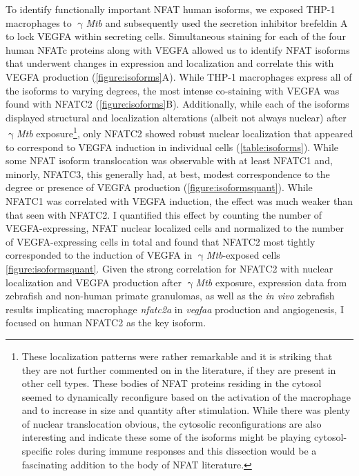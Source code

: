 To identify functionally important NFAT human isoforms, we exposed THP\hyp{}1 macrophages to $\upgamma$\textit{Mtb} and subsequently used the secretion inhibitor brefeldin A to lock VEGFA within secreting cells. Simultaneous staining for each of the four human NFATc proteins along with VEGFA allowed us to identify NFAT isoforms that underwent changes in expression and localization and correlate this with VEGFA production (\autoref{figure:isoforms}A). While THP\hyp{}1 macrophages express all of the isoforms to varying degrees, the most intense co\hyp{}staining with VEGFA was found with NFATC2 (\autoref{figure:isoforms}B). Additionally, while each of the isoforms displayed structural and localization alterations (albeit not always nuclear) after $\upgamma$\textit{Mtb} exposure\footnote{These localization patterns were rather remarkable and it is striking that they are not further commented on in the literature, if they are present in other cell types. These bodies of NFAT proteins residing in the cytosol seemed to dynamically reconfigure based on the activation of the macrophage and to increase in size and quantity after stimulation. While there was plenty of nuclear translocation obvious, the cytosolic reconfigurations are also interesting and indicate these some of the isoforms might be playing cytosol-specific roles during immune responses and this dissection would be a fascinating addition to the body of NFAT literature.}, only NFATC2 showed robust nuclear localization that appeared to correspond to VEGFA induction in individual cells (\autoref{table:isoforms}). While some NFAT isoform translocation was observable with at least NFATC1 and, minorly, NFATC3, this generally had, at best, modest correspondence to the degree or presence of VEGFA production (\autoref{figure:isoformsquant}). While NFATC1 was correlated with VEGFA induction, the effect was much weaker than that seen with NFATC2. I quantified this effect by counting the number of VEGFA\hyp{}expressing, NFAT nuclear localized cells and normalized to the number of VEGFA\hyp{}expressing cells in total and found that NFATC2 most tightly corresponded to the induction of VEGFA in $\upgamma$\textit{Mtb}\hyp{}exposed cells \autoref{figure:isoformsquant}. Given the strong correlation for NFATC2 with nuclear localization and VEGFA production after $\upgamma$\textit{Mtb} exposure, expression data from zebrafish and non\hyp{}human primate granulomas, as well as the \textit{in vivo} zebrafish results implicating macrophage \textit{nfatc2a} in \textit{vegfaa} production and angiogenesis, I focused on human NFATC2 as the key isoform.

